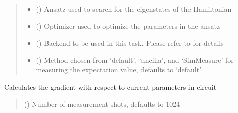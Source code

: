 \documentclass[letterpaper,10pt,english]{sphinxmanual}
\begin{document}
\begin{fulllineitems}
\begin{quote}
\begin{description}
\begin{itemize}
\item {} 
\sphinxAtStartPar
{} ({\hyperref[\detokenize{qcompute_qapp.circuit:qcompute_qapp.circuit.ParameterizedCircuit}]{}}) \textendash{} Ansatz used to search for the eigenstates of the Hamiltonian

\item {} 
\sphinxAtStartPar
{} ({\hyperref[\detokenize{qcompute_qapp.optimizer:qcompute_qapp.optimizer.BasicOptimizer}]{}}) \textendash{} Optimizer used to optimize the parameters in the ansatz

\item {} 
\sphinxAtStartPar
{} () \textendash{} Backend to be used in this task. Please refer to 
for details

\item {} 
\sphinxAtStartPar
{} () \textendash{} Method chosen from ‘default’, ‘ancilla’, and ‘SimMeasure’ for measuring the expectation
value, defaults to ‘default’

\end{itemize}

\end{description}\end{quote}

\begin{fulllineitems}
\label{\detokenize{qcompute_qapp.algorithm:qcompute_qapp.algorithm.SSVQE.get_gradient}}
\pysigstartsignatures
{}
\pysigstopsignatures
\sphinxAtStartPar
Calculates the gradient with respect to current parameters in circuit
\begin{quote}\begin{description}
\sphinxAtStartPar
{} () \textendash{} Number of measurement shots, defaults to 1024


\end{description}
\end{quote}
\end{fulllineitems}
\end{fulllineitems}
\end{document}
